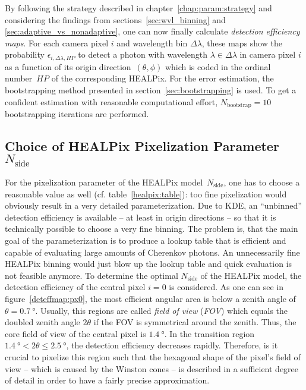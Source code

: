 By following the strategy described in chapter~\ref{chap:param:strategy} and considering the findings from sections~\ref{sec:wvl_binning} and \ref{sec:adaptive_vs_nonadaptive}, one can now finally calculate \textit{detection efficiency maps}. For each camera pixel $i$ and wavelength bin $\Delta\lambda$, these maps show the probability $\epsilon_{i,\Delta\lambda,HP}$ to detect a photon with wavelength $\lambda\in\Delta\lambda$ in camera pixel $i$ as a function of its origin direction~$(\theta,\phi)$ which is coded in the ordinal number~$HP$ of the corresponding HEALPix. For the error estimation, the bootstrapping method presented in section~\ref{sec:bootstrapping} is used. To get a confident estimation with reasonable computational effort, $N_\text{bootstrap} = \num{10}$ bootstrapping iterations are performed.\\

\subsection{Choice of HEALPix Pixelization Parameter $N_\text{side}$}

For the pixelization parameter of the HEALPix model~$N_\text{side}$, one has to choose a reasonable value as well (cf. table~\ref{healpix:table}): too fine pixelization would obviously result in a very detailed parameterization. Due to KDE, an \enquote{unbinned} detection efficiency is available -- at least in origin directions -- so that it is technically possible to choose a very fine binning. The problem is, that the main goal of the \iceact parameterization is to produce a lookup table that is efficient and capable of evaluating large amounts of Cherenkov photons. An unnecessarily fine HEALPix binning would just blow up the lookup table and quick evaluation is not feasible anymore. To determine the optimal $N_\text{side}$ of the HEALPix model, the detection efficiency of the central pixel $i=0$ is considered. As one can see in figure~\ref{deteffmap:px0}, the most efficient angular area is below a zenith angle of $\theta=\SI{0.7}{\degree}$. Usually, this regions are called \textit{field of view} (\textit{FOV}) which equals the doubled zenith angle $2\theta$ if the FOV is symmetrical around the zenith. Thus, the core field of view of the central pixel is $\SI{1.4}{\degree}$. In the transition region $\SI{1.4}{\degree} < 2\theta \leq \SI{2.5}{\degree}$, the detection efficiency decreases rapidly. Therefore, is it crucial to pixelize this region such that the hexagonal shape of the pixel's field of view -- which is caused by the Winston cones -- is described in a sufficient degree of detail in order to have a fairly precise approximation.

